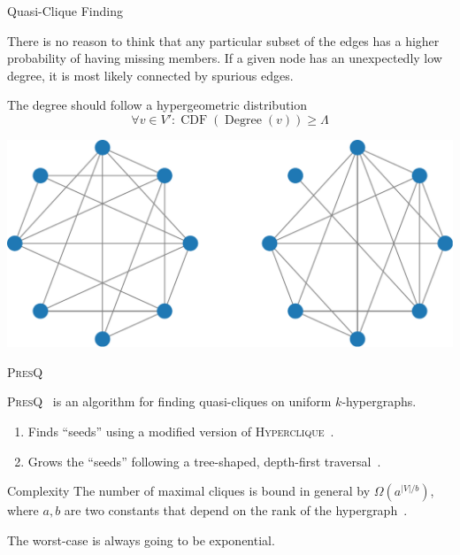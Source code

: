 \documentclass[10pt,notes]{beamer}
\newcommand{\PresQ}[0]{\textsc{PresQ}\xspace}
\begin{document}
\begin{frame}{Quasi-Clique Finding}
    \begin{block}{}
    There is no reason to think that any particular subset of the edges
    has a higher probability of having missing members. If a given node has an
    unexpectedly low degree, it is most likely connected by spurious edges.
    \end{block}
    \begin{block}{The degree should follow a hypergeometric distribution}
    \begin{equation}
        \forall v \in V': \operatorname{CDF}(\operatorname{Degree}(v)) \ge \Lambda
    \end{equation}
    \end{block}
    \centering
    \includegraphics[width=0.6\linewidth]{quasicliques}

\end{frame}

\begin{frame}{\PresQ}

    \begin{block}{}
    \PresQ~\cite{AlvarezAyllonPresQ2022} is an algorithm for finding quasi-cliques on uniform
    $k$-hypergraphs.
    
    \begin{enumerate}
        \item Finds ``seeds'' using a modified version of \textsc{Hyperclique}~\cite{koeller2003discovery}.
        \item Grows the ``seeds'' following a tree-shaped, depth-first
        traversal~\cite{uno_efficient_2010}.
    \end{enumerate}
    \end{block}
    
    \begin{alertblock}{Complexity}
        \smallskip
        The number of maximal cliques is bound in general by $\Omega(a^{|V|/b})$,
        where $a, b$ are two constants that depend on the rank of the hypergraph~\cite{Tomescu1981}.
        
        The worst-case is always going to be exponential.
    \end{alertblock}
\end{frame}
\end{document}
